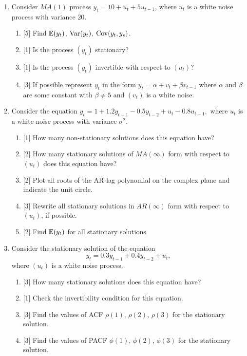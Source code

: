 \begin{enumerate}
\item Consider $MA(1)$ process $y_t = 10 + u_t + 5 u_{t-1}$, where $u_t$ is a white noise process with variance $20$.
\begin{enumerate}
    \item {[5]} Find $\operatorname{\mathbb{E}}(y_t)$, $\operatorname{Var}(y_t)$, $\operatorname{Cov}(y_t, y_s)$.
    \item {[1]} Is the process $(y_t)$ stationary?
    \item {[1]} Is the process $(y_t)$  invertible with respect to $(u_t)$?
    \item {[3]} If possible represent $y_t$ in the form $y_t = \alpha + v_t + \beta v_{t-1}$ where $\alpha$ and $\beta$ are some constant with $\beta \neq 5$ and $(v_t)$ is a white noise. 
\end{enumerate}

\item Consider the equation
\(
y_t = 1 + 1.2 y_{t-1} - 0.5 y_{t-2} + u_t - 0.8 u_{t-1},
\)
where \( u_t \) is a white noise process with variance $\sigma^2$.
\begin{enumerate}
    \item {[1]} How many non-stationary solutions does this equation have?
    \item {[2]} How many stationary solutions of $MA(\infty)$ form with respect to $(u_t)$ does this equation have? 
    \item {[2]} Plot all roots of the AR lag polynomial on the complex plane and indicate the unit circle.
    \item {[3]} Rewrite all stationary solutions in $AR(\infty)$ form with respect to $(u_t)$, if possible.  
    \item {[2]} Find $\operatorname{\mathbb{E}}(y_t)$ for all stationary solutions.
\end{enumerate}
\item   Consider the stationary solution of the equation
\[
y_t = 0.3 y_{t-1} + 0.4 y_{t-2} + u_t, 
\]
where $(u_t)$ is a white noise process. 
\begin{enumerate}
    \item {[3]} How many stationary solutions does this equation have?
    \item {[1]} Check the invertibility condition for this equation.
    \item {[3]} Find the values of ACF $\rho(1)$, $\rho(2)$, $\rho(3)$ for the stationary solution.
    \item {[3]} Find the values of PACF $\phi(1)$, $\phi(2)$, $\phi(3)$  for the stationary solution.
\end{enumerate}


\end{enumerate}
